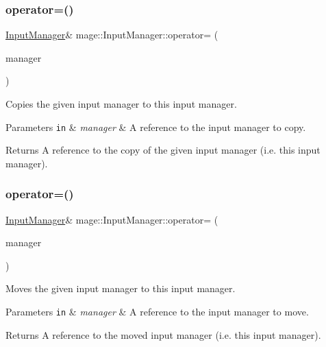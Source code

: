 \subsubsection{\texorpdfstring{operator=()}{operator=()}\hspace{0.1cm}{\footnotesize\ttfamily [1/2]}}
{\footnotesize\ttfamily \hyperlink{classmage_1_1_input_manager}{Input\+Manager}\& mage\+::\+Input\+Manager\+::operator= (\begin{DoxyParamCaption}\item[{const \hyperlink{classmage_1_1_input_manager}{Input\+Manager} \&}]{manager }\end{DoxyParamCaption})\hspace{0.3cm}{\ttfamily [delete]}}

Copies the given input manager to this input manager.


\begin{DoxyParams}[1]{Parameters}
\mbox{\tt in}  & {\em manager} & A reference to the input manager to copy. \\
\hline
\end{DoxyParams}
\begin{DoxyReturn}{Returns}
A reference to the copy of the given input manager (i.\+e. this input manager). 
\end{DoxyReturn}
\hypertarget{classmage_1_1_input_manager_a0cd7904b0cfe9a3d0c7b47f5913a54f9}{}\label{classmage_1_1_input_manager_a0cd7904b0cfe9a3d0c7b47f5913a54f9} 
\subsubsection{\texorpdfstring{operator=()}{operator=()}\hspace{0.1cm}{\footnotesize\ttfamily [2/2]}}
{\footnotesize\ttfamily \hyperlink{classmage_1_1_input_manager}{Input\+Manager}\& mage\+::\+Input\+Manager\+::operator= (\begin{DoxyParamCaption}\item[{\hyperlink{classmage_1_1_input_manager}{Input\+Manager} \&\&}]{manager }\end{DoxyParamCaption})\hspace{0.3cm}{\ttfamily [delete]}}

Moves the given input manager to this input manager.


\begin{DoxyParams}[1]{Parameters}
\mbox{\tt in}  & {\em manager} & A reference to the input manager to move. \\
\hline
\end{DoxyParams}
\begin{DoxyReturn}{Returns}
A reference to the moved input manager (i.\+e. this input manager). 
\end{DoxyReturn}
\hypertarget{classmage_1_1_input_manager_a5e516969ff4ae9876b98c28f48f93726}{}\label{classmage_1_1_input_manager_a5e516969ff4ae9876b98c28f48f93726} 
